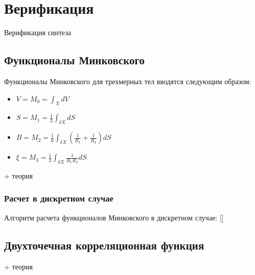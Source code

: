 \clearpage
\section{Верификация}

	Верификация синтеза
	
	\subsection{Функционалы Минковского}
		Функционалы Минковского для трехмерных тел вводятся следующим образом:
		\begin{itemize}
			\item $ \displaystyle V = M_0 = \int_{X} dV $
			\item $ \displaystyle S = M_1 = \frac{1}{3} \int_{\delta X} dS $
			\item $ \displaystyle B = M_2 = \frac{1}{6} \int_{\delta X} \left ( \frac{1}{R_1} + \frac{1}{R_2} \right ) dS$
			\item $\displaystyle \xi = M_3 = \frac{1}{3} \int_{\delta X} \frac{1}{R_1 R_2} dS $
		\end{itemize}
	
		+ теория
	
		\subsubsection{Расчет в дискретном случае}
			Алгоритм расчета функционалов Минковского в дискретном случае: []
	
	\subsection{Двухточечная корреляционная функция}
		
		+ теория
		